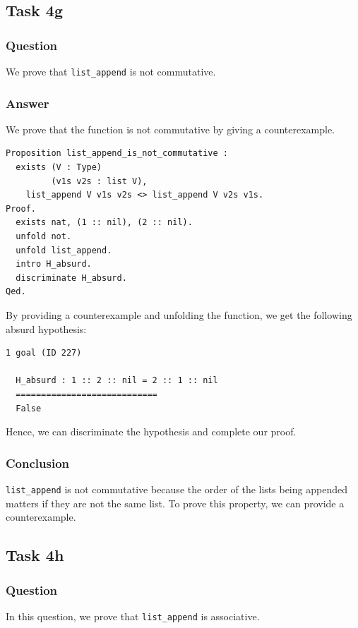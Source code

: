 \documentclass{article}
\begin{document}
\subsection{Task 4g}

\subsubsection{Question}
We prove that \texttt{list\_append} is not commutative.

\subsubsection{Answer}
We prove that the function is not commutative by giving a counterexample.

\begin{lstlisting}
Proposition list_append_is_not_commutative :
  exists (V : Type)
         (v1s v2s : list V),
    list_append V v1s v2s <> list_append V v2s v1s.
Proof.
  exists nat, (1 :: nil), (2 :: nil).
  unfold not.
  unfold list_append.
  intro H_absurd.
  discriminate H_absurd.
Qed.
\end{lstlisting}

By providing a counterexample and unfolding the function, we get the following absurd hypothesis:

\begin{lstlisting}
1 goal (ID 227)
  
  H_absurd : 1 :: 2 :: nil = 2 :: 1 :: nil
  ============================
  False
\end{lstlisting}

Hence, we can discriminate the hypothesis and complete our proof.

\subsubsection{Conclusion}
\texttt{list\_append} is not commutative because the order of the lists being appended matters if they are not the same list. To prove this property, we can provide a counterexample.

\subsection{Task 4h}

\subsubsection{Question}
In this question, we prove that \texttt{list\_append} is associative.
\end{document}
